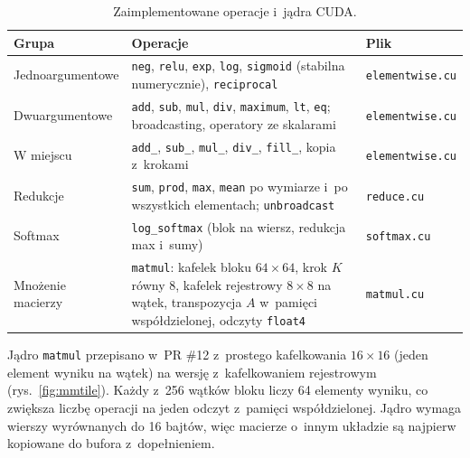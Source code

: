 \documentclass[11pt,a4paper]{article}
\begin{document}
\begin{table}[H]
\centering
\caption{Zaimplementowane operacje i~jądra CUDA.}
\label{tab:kernels}
\begin{tabularx}{\textwidth}{@{}lXl@{}}
\toprule
\textbf{Grupa} & \textbf{Operacje} & \textbf{Plik} \\
\midrule
Jednoargumentowe & \texttt{neg}, \texttt{relu}, \texttt{exp}, \texttt{log}, \texttt{sigmoid}
  (stabilna numerycznie), \texttt{reciprocal} & \texttt{elementwise.cu} \\
Dwuargumentowe & \texttt{add}, \texttt{sub}, \texttt{mul}, \texttt{div}, \texttt{maximum},
  \texttt{lt}, \texttt{eq}; broadcasting, operatory ze skalarami & \texttt{elementwise.cu} \\
W miejscu & \texttt{add\_}, \texttt{sub\_}, \texttt{mul\_}, \texttt{div\_}, \texttt{fill\_},
  kopia z~krokami & \texttt{elementwise.cu} \\
Redukcje & \texttt{sum}, \texttt{prod}, \texttt{max}, \texttt{mean} po wymiarze
  i~po wszystkich elementach; \texttt{unbroadcast} & \texttt{reduce.cu} \\
Softmax & \texttt{log\_softmax} (blok na wiersz, redukcja max i~sumy) & \texttt{softmax.cu} \\
Mnożenie macierzy & \texttt{matmul}: kafelek bloku $64\times64$, krok $K$ równy 8,
  kafelek rejestrowy $8\times8$ na wątek, transpozycja $A$ w~pamięci współdzielonej,
  odczyty \texttt{float4} & \texttt{matmul.cu} \\
\bottomrule
\end{tabularx}
\end{table}

Jądro \texttt{matmul} przepisano w~PR \#12 z~prostego kafelkowania $16\times16$ (jeden
element wyniku na wątek) na wersję z~kafelkowaniem rejestrowym (rys.~\ref{fig:mmtile}).
Każdy z~256 wątków bloku liczy 64 elementy wyniku, co zwiększa liczbę operacji na jeden
odczyt z~pamięci współdzielonej. Jądro wymaga wierszy wyrównanych do 16 bajtów, więc
macierze o~innym układzie są najpierw kopiowane do bufora z~dopełnieniem.
\end{document}
